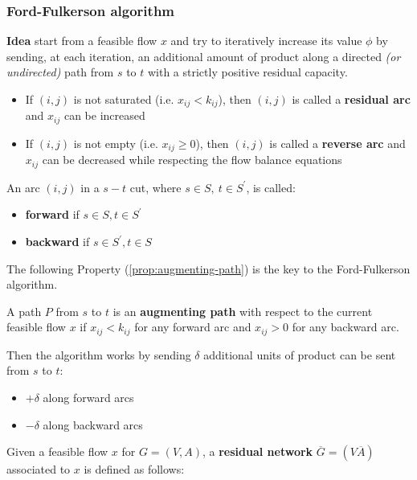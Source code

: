 \documentclass[english]{article}
\begin{document}
\subsubsection{Ford-Fulkerson algorithm}

\textbf{Idea}
start from a feasible flow \(x\) and try to iteratively increase its value \(\phi\) by sending, at each iteration, an additional amount of product along a directed \textit{(or undirected)} path from \(s\) to \(t\) with a strictly positive residual capacity.

\begin{itemize}
  \item If \(\left( i, j \right)\) is not saturated (i.e. \(x_{ij} < k_{ij}\)), then \(\left( i, j \right)\) is called a \textbf{residual arc} and \(x_{ij}\) can be increased
  \item If \(\left( i, j \right)\) is not empty (i.e. \(x_{ij} \geq 0\)), then \(\left( i, j \right)\) is called a \textbf{reverse arc} and \(x_{ij}\) can be decreased while respecting the flow balance equations
\end{itemize}

\bigskip
An arc \(\left( i, j \right)\) in a \(s-t\) cut, where \(s \in S,\ t \in S^\prime\), is called:
\begin{itemize}
  \item \textbf{forward} if \(s \in S, t \in S^\prime\)
  \item \textbf{backward} if \(s \in S^\prime, t \in S\)
\end{itemize}

The following Property (\ref{prop:augmenting-path}) is the key to the Ford-Fulkerson algorithm.
\begin{property}
  A path \(P\) from \(s\) to \(t\) is an \textbf{augmenting path} with respect to the current feasible flow \(x\) if \(x_{ij} <k_{ij}\) for any forward arc and \(x_{ij} > 0\) for any backward arc.
  \label{prop:augmenting-path}
\end{property}

Then the algorithm works by sending \(\delta\) additional units of product can be sent from \(s\) to \(t\):

\begin{itemize}
  \item \(+\delta\) along forward arcs
  \item \(-\delta\) along backward arcs
\end{itemize}

\bigskip
Given a feasible flow \(x\) for \(G = (V, A)\), a \textbf{residual network} \(\overline{G} = (V \overline{A})\) associated to \(x\) is defined as follows:
\end{document}
